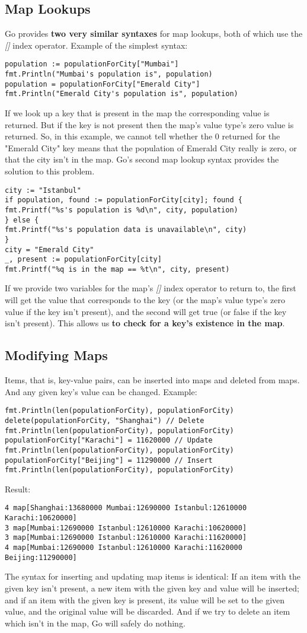 \documentclass[10pt,letterpaper]{report}
\begin{document}
\subsection{Map Lookups}
Go provides \textbf{two very similar syntaxes} for map lookups, both of which use the \textit{[]} index operator. Example of the simplest syntax:
\begin{lstlisting}
population := populationForCity["Mumbai"]
fmt.Println("Mumbai's population is", population)
population = populationForCity["Emerald City"]
fmt.Println("Emerald City's population is", population)
\end{lstlisting}
If we look up a key that is present in the map the corresponding value is returned. But if the key is not present then the map's value type's zero value is returned. So, in this example, we cannot tell whether the 0 returned for the "Emerald City" key means that the population of Emerald City really is zero, or that the city isn't in the map. Go's second map lookup syntax provides the solution to this problem.
\begin{lstlisting}
city := "Istanbul"
if population, found := populationForCity[city]; found {
fmt.Printf("%s's population is %d\n", city, population)
} else {
fmt.Printf("%s's population data is unavailable\n", city)
}
city = "Emerald City"
_, present := populationForCity[city]
fmt.Printf("%q is in the map == %t\n", city, present)
\end{lstlisting}
If we provide two variables for the map's \textit{[]} index operator to return to, the first will get the value that corresponds to the key (or the map's value type's zero value if the key isn't present), and the second will get true (or false if the key  isn't present). This allows us \textbf{to check for a key's existence in the map}.
\subsection{Modifying Maps}
Items, that is, key-value pairs, can be inserted into maps and deleted from maps. And any given key's value can be changed. Example:
\begin{lstlisting}
fmt.Println(len(populationForCity), populationForCity)
delete(populationForCity, "Shanghai") // Delete
fmt.Println(len(populationForCity), populationForCity)
populationForCity["Karachi"] = 11620000 // Update
fmt.Println(len(populationForCity), populationForCity)
populationForCity["Beijing"] = 11290000 // Insert
fmt.Println(len(populationForCity), populationForCity)
\end{lstlisting}
Result:
\begin{lstlisting}
4 map[Shanghai:13680000 Mumbai:12690000 Istanbul:12610000 Karachi:10620000]
3 map[Mumbai:12690000 Istanbul:12610000 Karachi:10620000]
3 map[Mumbai:12690000 Istanbul:12610000 Karachi:11620000]
4 map[Mumbai:12690000 Istanbul:12610000 Karachi:11620000 Beijing:11290000]
\end{lstlisting}
The syntax for inserting and updating map items is identical: If an item with the given key isn't present, a new item with the given key and value will be inserted; and if an item with the given key is present, its value will be set to the given value, and the original value will be discarded. And if we try to delete an item which isn't in the map, Go will safely do nothing.
\end{document}
